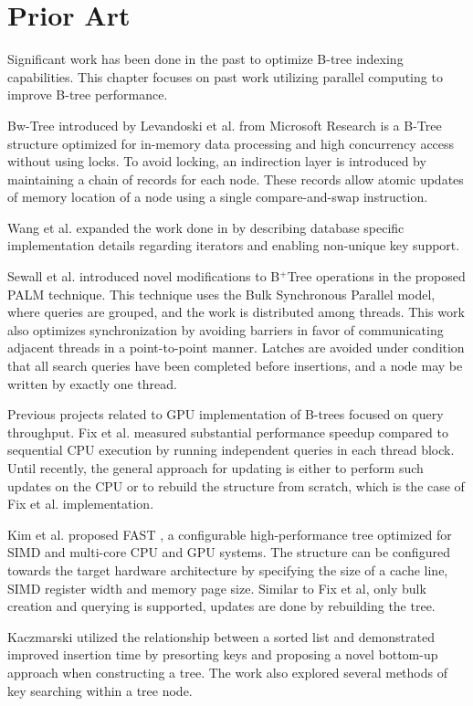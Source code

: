 \section{Prior Art}

Significant work has been done in the past to optimize B-tree indexing capabilities. This chapter focuses on past work utilizing parallel computing to improve B-tree performance.

Bw-Tree introduced by Levandoski et al. \cite{bw-tree} from Microsoft Research is a B-Tree structure optimized for in-memory data processing and high concurrency access without using locks. To avoid locking, an indirection layer is introduced by maintaining a chain of records for each node. These records allow atomic updates of memory location of a node using a single compare-and-swap instruction.

Wang et al. \cite{openbw-tree} expanded the work done in \cite{bw-tree} by describing database specific implementation details regarding iterators and enabling non-unique key support.

Sewall et al. \cite{palm} introduced novel modifications to B$^+$Tree operations in the proposed PALM technique. This technique uses the Bulk Synchronous Parallel model, where queries are grouped, and the work is distributed among threads. This work also optimizes synchronization by avoiding barriers in favor of communicating adjacent threads in a point-to-point manner. Latches are avoided under condition that all search queries have been completed before insertions, and a node may be written by exactly one thread.

Previous projects related to GPU implementation of B-trees focused on query throughput. Fix et al. \cite{fix2011accelerating} measured substantial performance speedup compared to sequential CPU execution by running independent queries in each thread block. Until recently, the general approach for updating is either to perform such updates on the CPU or to rebuild the structure from scratch, which is the case of Fix et al. implementation.

Kim et al. proposed FAST \cite{fast}, a configurable high-performance tree optimized for SIMD and multi-core CPU and GPU systems. The structure can be configured towards the target hardware architecture by specifying the size of a cache line, SIMD register width and memory page size. Similar to Fix et al, only bulk creation and querying is supported, updates are done by rebuilding the tree.

Kaczmarski \cite{kaczmarski} utilized the relationship between a sorted list and demonstrated improved insertion time by presorting keys and proposing a novel bottom-up approach when constructing a tree. The work also explored several methods of key searching within a tree node.

